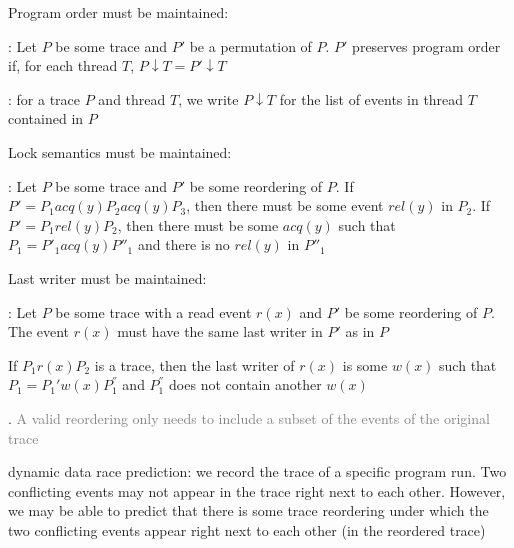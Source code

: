 \documentclass[landscape, a4paper]{article}
\begin{document}
\begin{minipage}[t]{0.2\linewidth}
\begin{betterlist}
\begin{enumerate}
			\item \alert{Program order must be maintained}:
			\end{betterlist}
			\item \alert{Lock semantics must be maintained}:
			\begin{betterlist}
				\item {}: Let $P$ be some trace and $P'$ be some reordering of $P$. If $𝑃' = P_1 acq(y) P_2 acq(y) P_3$, then there must be some event $rel(y)$ in $P_2$. If $P' = P_1 rel(y) P_2$, then there must be some $acq(y)$ such that $P_1 = P'_1 acq(y) P''_1$ and there is no $rel(y)$ in $𝑃''_1$
			\end{betterlist}
			\item \alert{Last writer must be maintained}:
			\begin{betterlist}
				\item {}: Let $P$ be some trace with a read event $r(x)$ and $P'$ be some reordering of $P$. The event $r(x)$ must have the same \alert{last writer} in $P'$ as in $P$
				\begin{betterlist}
					\item If $P_1 r(𝑥) P_2$ is a trace, then the \alert{last writer} of $r(x)$ is some $w(x)$ such that $P_1 = P_1' w(x) P_1^{''}$ and $P_1^{''}$ does not contain another $w(x)$
				\end{betterlist}
			\end{betterlist}
			\item[$\textcolor{PrimaryColor}{\bullet}$] \script{99}{Example}
			\item[$\textcolor{PrimaryColor}{\bullet}$] . \textcolor{gray}{A valid reordering only needs to include a subset of the events of the original trace}
		\end{enumerate}
		\item \alert{dynamic data race prediction}: we record the trace of a specific program run. Two conflicting events may not appear in the trace right next to each other. However, we may be able to predict that there is some trace reordering under which the two conflicting events appear right next to each other (in the reordered trace)

\end{betterlist}
\end{minipage}
\end{document}
